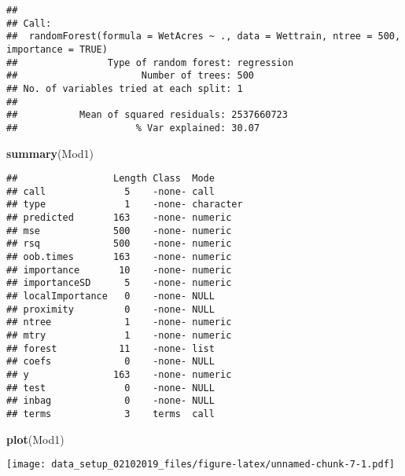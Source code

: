 \documentclass[]{article}
\newenvironment{Shaded}{\begin{snugshade}}{\end{snugshade}}
\newcommand{\KeywordTok}[1]{\textcolor[rgb]{0.13,0.29,0.53}{\textbf{{#1}}}}
\newcommand{\DataTypeTok}[1]{\textcolor[rgb]{0.13,0.29,0.53}{{#1}}}
\newcommand{\StringTok}[1]{\textcolor[rgb]{0.31,0.60,0.02}{{#1}}}
\newcommand{\CommentTok}[1]{\textcolor[rgb]{0.56,0.35,0.01}{\textit{{#1}}}}
\newcommand{\NormalTok}[1]{{#1}}
\begin{document}
\begin{verbatim}
## 
## Call:
##  randomForest(formula = WetAcres ~ ., data = Wettrain, ntree = 500,      importance = TRUE) 
##                Type of random forest: regression
##                      Number of trees: 500
## No. of variables tried at each split: 1
## 
##           Mean of squared residuals: 2537660723
##                     % Var explained: 30.07
\end{verbatim}

\begin{Shaded}
\begin{Highlighting}[]
\KeywordTok{summary}\NormalTok{(Mod1)}
\end{Highlighting}
\end{Shaded}

\begin{verbatim}
##                 Length Class  Mode     
## call              5    -none- call     
## type              1    -none- character
## predicted       163    -none- numeric  
## mse             500    -none- numeric  
## rsq             500    -none- numeric  
## oob.times       163    -none- numeric  
## importance       10    -none- numeric  
## importanceSD      5    -none- numeric  
## localImportance   0    -none- NULL     
## proximity         0    -none- NULL     
## ntree             1    -none- numeric  
## mtry              1    -none- numeric  
## forest           11    -none- list     
## coefs             0    -none- NULL     
## y               163    -none- numeric  
## test              0    -none- NULL     
## inbag             0    -none- NULL     
## terms             3    terms  call
\end{verbatim}

\begin{Shaded}
\begin{Highlighting}[]
\KeywordTok{plot}\NormalTok{(Mod1)}
\end{Highlighting}
\end{Shaded}

\texttt{[image: data\_setup\_02102019\_files/figure-latex/unnamed-chunk-7-1.pdf]}

\begin{Shaded}
\end{Shaded}
\end{document}
